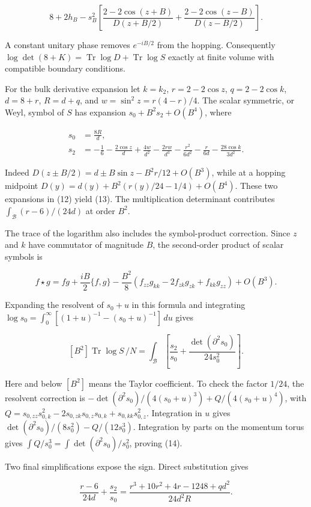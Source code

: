 \documentclass[11pt,a4paper]{article}
\begin{document}
\[8+2h_B-s_B^2\left[
\frac{2-2\cos(z+B)}{D(z+B/2)}+
\frac{2-2\cos(z-B)}{D(z-B/2)}\right].\tag{12}\]

A constant unitary phase removes \(e^{-iB/2}\) from the hopping.
Consequently
\(\log\det(8+K)=\operatorname{Tr}\log D+ \operatorname{Tr}\log S\)
exactly at finite volume with compatible boundary conditions.

For the bulk derivative expansion let \(k=k_2\), \(r=2-2\cos z\),
\(q=2-2\cos k\), \(d=8+r\), \(R=d+q\), and \(w=\sin^2z=r(4-r)/4\). The
scalar symmetric, or Weyl, symbol of \(S\) has expansion
\(s_0+B^2s_2+O(B^4)\), where

\[\begin{aligned}
s_0&=\frac{8R}{d},\\
s_2&=-\frac16-\frac{2\cos z}{d}+\frac{4w}{d^2}
 -\frac{2rw}{d^3}-\frac{r^2}{6d^2}-\frac r{6d}
 -\frac{28\cos k}{3d^2}.
\end{aligned}\tag{13}\]

Indeed \(D(z\pm B/2)=d\pm B\sin z-B^2r/12+O(B^3)\), while at a hopping
midpoint \(D(y)=d(y)+B^2(r(y)/24-1/4)+O(B^4)\). These two expansions in
(12) yield (13). The multiplication determinant contributes
\(\int_{\mathcal B}(r-6)/(24d)\) at order \(B^2\).

The trace of the logarithm also includes the symbol-product correction.
Since \(z\) and \(k\) have commutator of magnitude \(B\), the
second-order product of scalar symbols is

\[f\star g=fg+\frac{iB}{2}\{f,g\}
 -\frac{B^2}{8}(f_{zz}g_{kk}-2f_{zk}g_{zk}+f_{kk}g_{zz})+O(B^3).\]

Expanding the resolvent of \(s_0+u\) in this formula and integrating
\(\log s_0=\int_0^\infty[(1+u)^{-1}-(s_0+u)^{-1}]\,du\) gives

\[[B^2]\operatorname{Tr}\log S\,/N
=\int_{\mathcal B}\left[
\frac{s_2}{s_0}+\frac{\det(\partial^2s_0)}{24s_0^2}\right].\tag{14}\]

Here and below \([B^2]\) means the Taylor coefficient. To check the
factor \(1/24\), the resolvent correction is
\(-\det(\partial^2s_0)/(4(s_0+u)^3)+ Q/(4(s_0+u)^4)\), with
\(Q=s_{0,zz}s_{0,k}^2-2s_{0,zk}s_{0,z}s_{0,k} +s_{0,kk}s_{0,z}^2\).
Integration in \(u\) gives \(\det(\partial^2s_0)/(8s_0^2)-Q/(12s_0^3)\).
Integration by parts on the momentum torus gives
\(\int Q/s_0^3=\int\det(\partial^2s_0)/s_0^2\), proving (14).

Two final simplifications expose the sign. Direct substitution gives

\[\frac{r-6}{24d}+\frac{s_2}{s_0}
=\frac{r^3+10r^2+4r-1248+qd^2}{24d^2R}.\]
\end{document}
